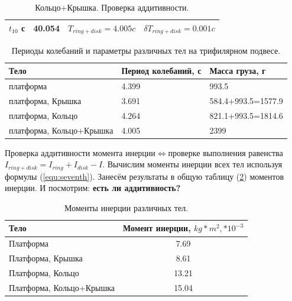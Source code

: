 \documentclass[12pt,a4paper]{article}
\begin{document}
          \begin{table}[ht!]
	\begin{center}
	\begin{tabular}{|c|c||c|c|}
		\hline
		$t_{10}$ с & 40.054 & $T_{ring+disk} = 4.005c$ &$\delta T_{ring+disk} = 0.001c$\\
		\hline
	\end{tabular}
    \caption{Кольцо+Крышка. Проверка аддитивности.}
	\end{center}
	\end{table}

		\begin{table}[ht!]
			\begin{center}
			\begin{tabular}{| p{65pt} | p{110pt} | p{100pt} |}
					\hline
					Тело & Период колебаний, с & Масса груза, г \\ \hline
					платформа &4.399 & 993.5 \\ \hline
					платформа, Крышка & 3.691 & 584.4+993.5=1577.9 \\ \hline
					платформа, Кольцо & 4.264 & 821.1+993.5=1814.6 \\ \hline
					платформа, Кольцо+Крышка & 4.005 & 2399 \\
					\hline
				\end{tabular}
			\end{center}
			\caption{Периоды колебаний и параметры различных тел на трифилярном подвесе.}
			\label{tab:periods_diff_body}
		\end{table}

Проверка аддитивности момента инерции$\Leftrightarrow$проверке выполнения равенства $I_{ring+disk}=I_{ring}+I_{disk}-I$. Вычислим моменты инерции всех тел используя формулы (\ref{equ:seventh}). Занесём результаты в общую таблицу (\ref{tab:moments}) моментов инерции. И посмотрим: \textbf{есть ли аддитивность?}

  		\begin{table}[h!]
			\begin{center}
				\begin{tabular}{| l | c |}
				\hline
				Тело & Момент инерции, $kg*m^{2}, * 10^{-3}$ \\ \hline
				Платформа & 7.69 \\ \hline
				Платформа, Крышка & 8.61 \\ \hline
				Платформа, Кольцо & 13.21 \\ \hline
				Платформа, Кольцо+Крышка & 15.04 \\ \hline
				\end{tabular}
				\caption{Моменты инерции различных тел.}
				\label{tab:moments}
			\end{center}					
		\end{table}
\end{document}
